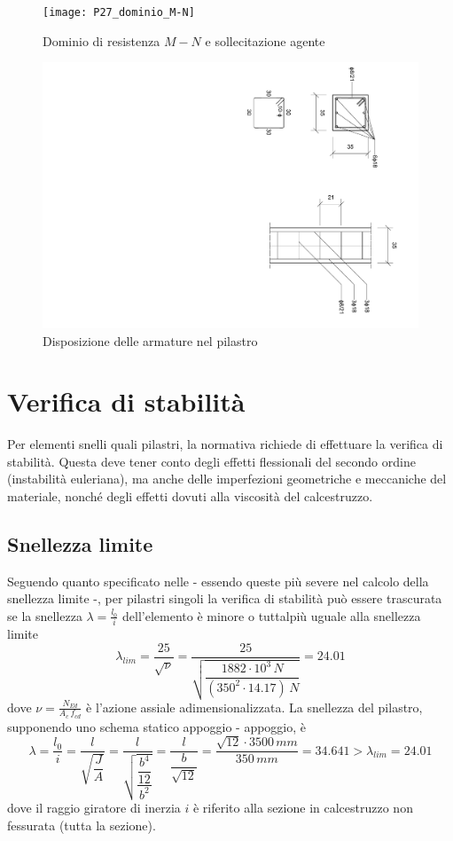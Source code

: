 \begin{figure}
    \centering
	\texttt{[image: P27\_dominio\_M-N]}
	\caption{Dominio di resistenza $M-N$ e sollecitazione agente}
\end{figure}

\begin{figure}
    \centering
	\includegraphics[angle=90, width=\textwidth]{../../disposizioneArmaturePilastro}
	\caption{Disposizione delle armature nel pilastro}
\end{figure}

\section{Verifica di stabilità}
Per elementi snelli quali pilastri, la normativa richiede di effettuare la verifica di stabilità. Questa deve tener conto degli effetti flessionali del secondo ordine (instabilità euleriana), ma anche delle imperfezioni geometriche e meccaniche del materiale, nonché degli effetti dovuti alla viscosità del calcestruzzo. 

\subsection{Snellezza limite}
Seguendo quanto specificato nelle \ntc - essendo queste più severe nel calcolo della  snellezza limite -, per pilastri singoli la verifica di stabilità può essere trascurata se la snellezza $\lambda = \frac{l_0}{i}$ dell'elemento è minore o tuttalpiù uguale alla snellezza limite 
\[
\lambda_{lim} = \dfrac{25}{\sqrt{\nu}} = \dfrac{25}{\sqrt{\dfrac{1882\cdot 10^3\,N}{(350^2\cdot14.17)\,N}}} = 24.01
\]
dove $\nu = \frac{N_{Ed}}{A_c\,f_{cd}}$ è l'azione assiale adimensionalizzata. La snellezza del pilastro, supponendo uno schema statico appoggio - appoggio, è
\[
\lambda = \dfrac{l_0}{i} = \dfrac{l}{\sqrt{\dfrac{J}{A}}} = \dfrac{l}{\sqrt{\dfrac{\dfrac{b^4}{12}}{b^2}}} = \dfrac{l}{\dfrac{b}{\sqrt{12}}} = \dfrac{\sqrt{12}\cdot 3500\,mm}{350\,mm} = 34.641 > \lambda_{lim} = 24.01
\]
dove il raggio giratore di inerzia $i$ è riferito alla sezione in calcestruzzo non fessurata (tutta la sezione).

